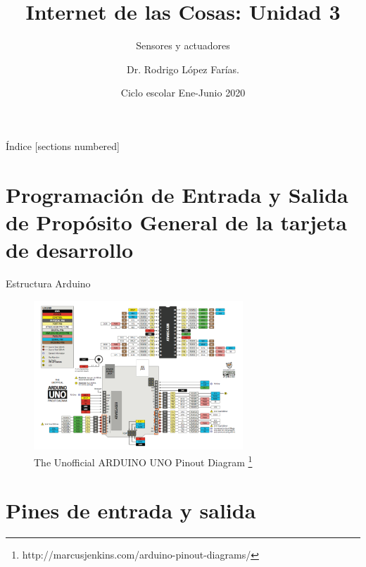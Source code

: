 \documentclass{beamer}
\title{Internet de las Cosas:  Unidad 3}
\subtitle{Sensores y actuadores}
\author{Dr. Rodrigo López Farías. \\}
\institute{Instituto Tecnológico de Querétaro \\ Ingeniería en Sistemas Computacionales}
\date{Ciclo escolar Ene-Junio 2020}
\begin{document}
\frame{\maketitle}


\begin{frame}{Índice}
  [sections numbered]
  \tableofcontents[hideallsubsections]
\end{frame}





\section{Programación de Entrada y Salida de Propósito General de la tarjeta de desarrollo}

\begin{frame}{Estructura Arduino}

\begin{figure}
\centering
\includegraphics[width=0.7\textwidth]{figures/arduinounoref.png}
\caption{The Unofficial ARDUINO UNO Pinout Diagram \footnote{http://marcusjenkins.com/arduino-pinout-diagrams/} }
\end{figure}

\end{frame}


\section{Pines de entrada y salida}
\end{document}
